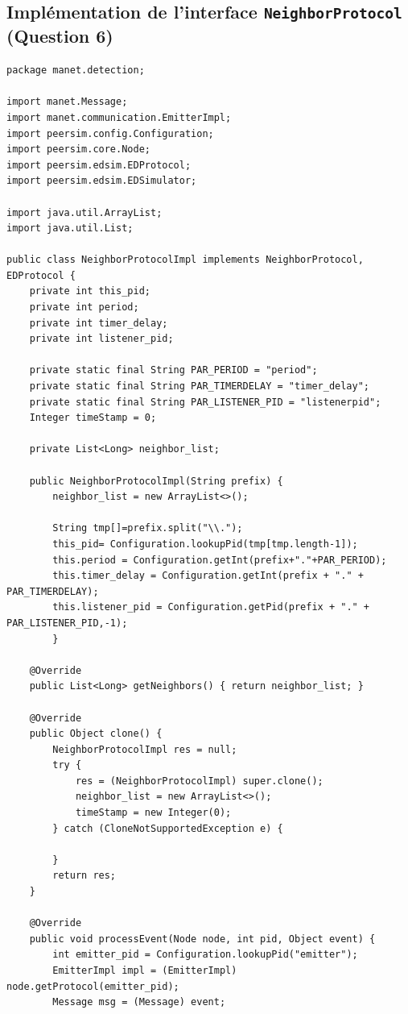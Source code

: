 \documentclass[a4paper]{article}
\begin{document}
\subsection{Implémentation de l'interface \texttt{NeighborProtocol} (Question 6)}


\begin{lstlisting}
package manet.detection;

import manet.Message;
import manet.communication.EmitterImpl;
import peersim.config.Configuration;
import peersim.core.Node;
import peersim.edsim.EDProtocol;
import peersim.edsim.EDSimulator;

import java.util.ArrayList;
import java.util.List;

public class NeighborProtocolImpl implements NeighborProtocol, EDProtocol {
    private int this_pid;
    private int period;
    private int timer_delay;
    private int listener_pid;

    private static final String PAR_PERIOD = "period";
    private static final String PAR_TIMERDELAY = "timer_delay";
    private static final String PAR_LISTENER_PID = "listenerpid";
    Integer timeStamp = 0;

    private List<Long> neighbor_list;

    public NeighborProtocolImpl(String prefix) {
        neighbor_list = new ArrayList<>();

        String tmp[]=prefix.split("\\.");
        this_pid= Configuration.lookupPid(tmp[tmp.length-1]);
        this.period = Configuration.getInt(prefix+"."+PAR_PERIOD);
        this.timer_delay = Configuration.getInt(prefix + "." + PAR_TIMERDELAY);
        this.listener_pid = Configuration.getPid(prefix + "." + PAR_LISTENER_PID,-1);
        }

    @Override
    public List<Long> getNeighbors() { return neighbor_list; }

    @Override
    public Object clone() {
        NeighborProtocolImpl res = null;
        try {
            res = (NeighborProtocolImpl) super.clone();
            neighbor_list = new ArrayList<>();
            timeStamp = new Integer(0);
        } catch (CloneNotSupportedException e) {

        }
        return res;
    }

    @Override
    public void processEvent(Node node, int pid, Object event) {
        int emitter_pid = Configuration.lookupPid("emitter");
        EmitterImpl impl = (EmitterImpl) node.getProtocol(emitter_pid);
        Message msg = (Message) event;


\end{lstlisting}
\end{document}
